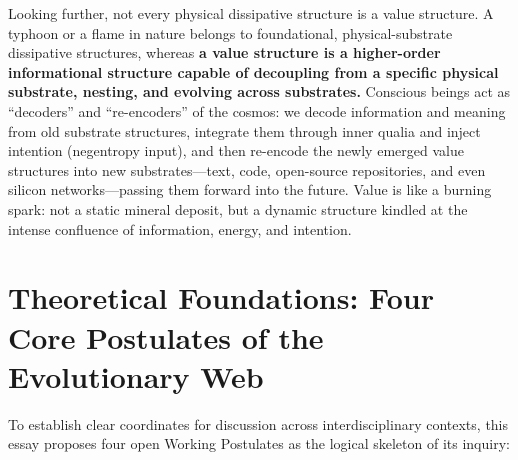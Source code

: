 \documentclass[11pt,a4paper]{article}
\begin{document}
Looking further, not every physical dissipative structure is a value structure. A typhoon or a flame in nature belongs to foundational, physical-substrate dissipative structures, whereas \textbf{a value structure is a higher-order informational structure capable of decoupling from a specific physical substrate, nesting, and evolving across substrates.} Conscious beings act as ``decoders'' and ``re-encoders'' of the cosmos: we decode information and meaning from old substrate structures, integrate them through inner qualia and inject intention (negentropy input), and then re-encode the newly emerged value structures into new substrates---text, code, open-source repositories, and even silicon networks---passing them forward into the future. Value is like a burning spark: not a static mineral deposit, but a dynamic structure kindled at the intense confluence of information, energy, and intention.

\section{Theoretical Foundations: Four Core Postulates of the Evolutionary Web}

To establish clear coordinates for discussion across interdisciplinary contexts, this essay proposes four open Working Postulates as the logical skeleton of its inquiry:
\end{document}
